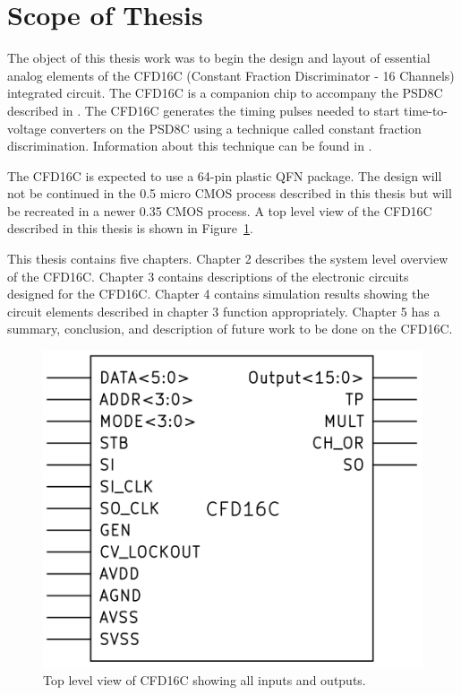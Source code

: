 \documentclass[12pt,oneside,final]{siuethesis}
\theoremstyle{definition}
\begin{document}
\section{Scope of Thesis}
\par The object of this thesis work was to begin the design and layout of essential analog elements of the CFD16C (Constant Fraction Discriminator - 16 Channels) integrated circuit. The CFD16C is a companion chip to accompany the PSD8C described in \cite{PROCTOR}. The CFD16C generates the timing pulses needed to start time-to-voltage converters on the PSD8C using a technique called constant fraction discrimination. Information about this technique can be found in \cite{NOWLIN}.
\par The CFD16C is expected to use a 64-pin plastic QFN package. The design will not be continued in the 0.5 micro CMOS process described in this thesis but will be recreated in a newer 0.35 CMOS process. A top level view of the CFD16C described in this thesis is shown in Figure~\ref{fig:CFDtop}.
\par This thesis contains five chapters. Chapter 2 describes the system level overview of the CFD16C. Chapter 3 contains descriptions of the electronic circuits designed for the CFD16C. Chapter 4 contains simulation results showing the circuit elements described in chapter 3 function appropriately. Chapter 5 has a summary, conclusion, and description of future work to be done on the CFD16C.
\vspace{0.25in}
\begin{figure}[ht]
\centering
\includegraphics[scale=.8,keepaspectratio=true]{images/CFDtop.png} 
\caption{Top level view of CFD16C showing all inputs and outputs.}
\label{fig:CFDtop}
\end{figure}
\end{document}
